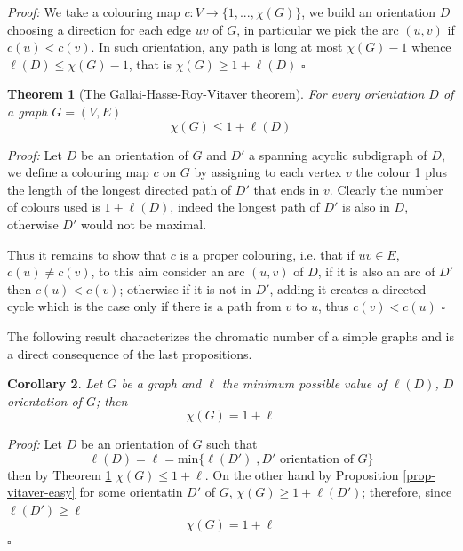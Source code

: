 \documentclass[a4paper,12pt,oneside]{book}
\newtheorem{theorem}{Theorem}[chapter]
\newtheorem{corollary}[theorem]{Corollary}
\newcommand*{\QED}{\hfill\ensuremath{\square}}
\begin{document}
\textit{Proof:}  We take a colouring map $c:V\rightarrow \{1,...,\chi (G)\}$, we build an orientation
 $D$ choosing a direction for each edge $uv$ of $G$, in particular we pick the arc 
 $(u,v)$ if $c(u)< c(v)$. In such orientation, any path is long at most $\chi 
 (G)-1$ whence $\ell(D)\leq \chi (G)-1  $, that is $ \chi (G) \geq 1+\ell(D) $ 
\QED

\begin{theorem}[The Gallai-Hasse-Roy-Vitaver theorem]\label{vitaver}
For every orientation $D$ of a graph $G=(V,E)$ $$\chi (G)\leq 1 + \ell(D)$$
\end{theorem}
\textit{Proof: }Let $D$ be an orientation of $G$ and $D'$ a spanning acyclic subdigraph of $D$, we define a colouring map $c$ on $G$ by assigning to each vertex $v$ the colour 1 plus the length of the longest directed path of $D'$ that ends in $v$. Clearly the number of colours used is $1+\ell(D)$, indeed the longest path of $D'$ is also in $D$, otherwise $D'$ would not be maximal. 

Thus it remains to show that $c$ is a proper colouring, i.e. that if $uv\in E$, $c(u)\neq c(v) $, to this aim consider an arc $(u,v)$ of $D$, if it is also an arc of $D'$ then $c(u)<c(v)$; otherwise if it is not in $D'$, adding it creates a directed cycle which is the case only if there is a path from $v$ to $u$, thus $c(v)<c(u)$ \QED

\noindent The following result characterizes the chromatic number of a simple graphs and is a direct consequence of the last propositions.
\begin{corollary}\label{cor-vitaver}
Let $G$ be a graph and $\ell$ the minimum possible value of $\ell(D)$, $D$ orientation of $G$; then   
$$\chi (G)=1+\ell$$
\end{corollary}

\textit{Proof:}
Let $D$ be an orientation of $G$ such that 
$$\ell(D)=\ell=\textrm{min}\{\ell(D') \; 	,D' \textrm{ orientation of } G\}$$ 
then by Theorem \ref{vitaver} $\chi(G) \leq 1+\ell$. On the other hand by Proposition \ref{prop-vitaver-easy} for some orientatin $D'$  of $G$, $\chi(G)\geq 1+\ell(D')$; therefore, since $\ell(D')\geq\ell$ 
$$\chi (G)=1+\ell$$\QED
\end{document}
